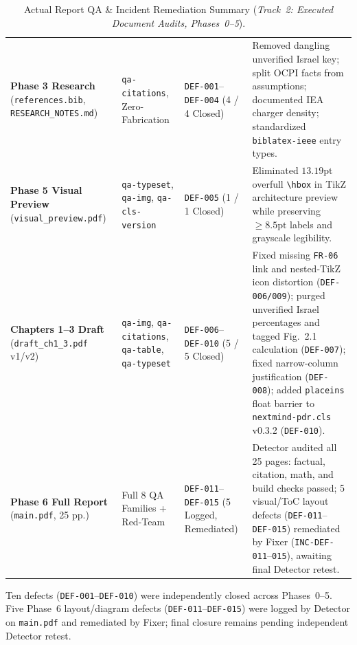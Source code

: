 \begin{table}[htbp]
  \centering
  \caption{Actual Report QA \& Incident Remediation Summary (\emph{Track~2: Executed Document Audits, Phases~0--5}).}
  \label{tab:actual-qa-summary}
  {\footnotesize
  \begin{tabularx}{\linewidth}{@{}P{24mm} P{26mm} P{22mm} L@{}}
    \toprule
     &  &  &  \\
    \midrule
    \textbf{Phase 3 Research} (\texttt{references.bib}, \texttt{RESEARCH\_NOTES.md}) & \texttt{qa-citations}, Zero-Fabrication & \texttt{DEF-001}--\texttt{DEF-004} (4 / 4 Closed) & Removed dangling unverified Israel key; split OCPI facts from assumptions; documented IEA charger density; standardized \texttt{biblatex-ieee} entry types. \\
    \textbf{Phase 5 Visual Preview} (\texttt{visual\_\-preview.pdf}) & \texttt{qa-typeset}, \texttt{qa-img}, \texttt{qa-cls-version} & \texttt{DEF-005} (1 / 1 Closed) & Eliminated $13.19\text{pt}$ overfull \texttt{\textbackslash hbox} in TikZ architecture preview while preserving $\ge 8.5\text{pt}$ labels and grayscale legibility. \\
    \textbf{Chapters 1--3 Draft} (\texttt{draft\_ch1\_3.pdf} v1/v2) & \texttt{qa-img}, \texttt{qa-citations}, \texttt{qa-table}, \texttt{qa-typeset} & \texttt{DEF-006}--\texttt{DEF-010} (5 / 5 Closed) & Fixed missing \texttt{FR-06} link and nested-TikZ icon distortion (\texttt{DEF-006/009}); purged unverified Israel percentages and tagged Fig.~2.1 calculation (\texttt{DEF-007}); fixed narrow-column justification (\texttt{DEF-008}); added \texttt{placeins} float barrier to \texttt{nextmind-pdr.cls} v0.3.2 (\texttt{DEF-010}). \\
    \textbf{Phase 6 Full Report} (\texttt{main.pdf}, 25 pp.) & Full 8 QA Families + Red-Team & \texttt{DEF-011}--\texttt{DEF-015} (5 Logged, Remediated) & Detector audited all 25 pages: factual, citation, math, and build checks passed; 5 visual/ToC layout defects (\texttt{DEF-011}--\texttt{DEF-015}) remediated by Fixer (\texttt{INC-DEF-011}--\texttt{015}), awaiting final Detector retest. \\
    \bottomrule
  \end{tabularx}
  }
\end{table}

\begin{sagebox}
  Ten defects (\texttt{DEF-001}--\texttt{DEF-010}) were independently closed across Phases~0--5. Five Phase~6 layout/diagram defects (\texttt{DEF-011}--\texttt{DEF-015}) were logged by Detector on \texttt{main.pdf} and remediated by Fixer; final closure remains pending independent Detector retest.
\end{sagebox}

